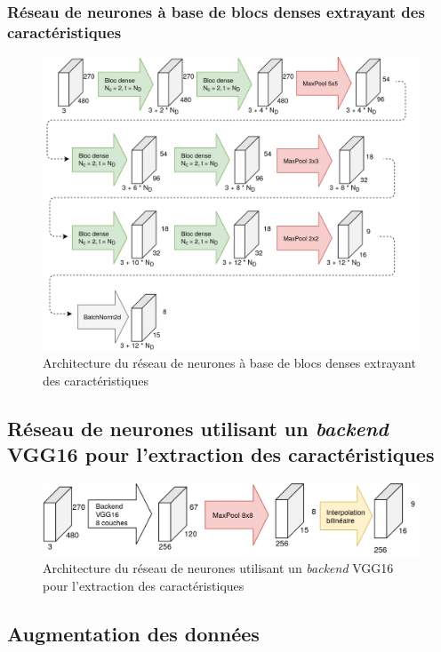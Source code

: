 \subsubsection{Réseau de neurones à base de blocs denses extrayant des caractéristiques}
    \begin{figure}[H]
        \centering
        \includegraphics[width=17cm]{images/Architecture_SmallCnnWithAutoencoderDenseBlocks.png}
        \caption{Architecture du réseau de neurones à base de blocs denses extrayant des caractéristiques}
        \label{fig:architecture_small_cnn_dense_bloc}
    \end{figure}

\subsection{Réseau de neurones utilisant un \textit{backend} VGG16 pour l'extraction des caractéristiques}
    \begin{figure}[H]
        \centering
        \includegraphics[width=12cm]{images/Architecture_Vgg16BackendAutoencoder.png}
        \caption{Architecture du réseau de neurones utilisant un \textit{backend} VGG16 pour l'extraction des caractéristiques}
        \label{fig:architecture_vgg16}
    \end{figure}

\subsection{Augmentation des données}
    